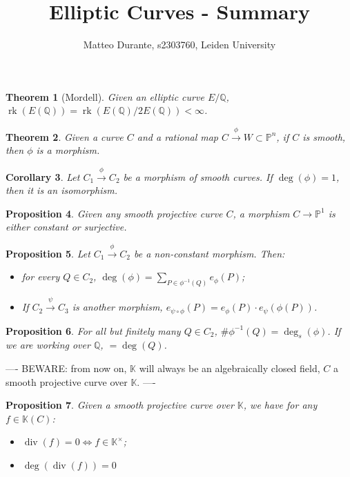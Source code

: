 \documentclass{article}
\newcommand{\numberset}{\mathbb}
\newcommand{\Q}{\numberset{Q}}
\newcommand{\K}{\numberset{K}}
\newcommand{\Ps}{\mathbb{P}}
\DeclareMathOperator{\rk}{rk}
\DeclareMathOperator{\dv}{div}
\theoremstyle{plain}
\newtheorem{thm}{Theorem}
\newtheorem{prop}[thm]{Proposition}
\newtheorem{cor}[thm]{Corollary}
\theoremstyle{definition}
\begin{document}
\title{Elliptic Curves - Summary}

\author{Matteo Durante, s2303760, Leiden University}

\maketitle

\begin{thm}[Mordell]
    Given an elliptic curve $E/\Q$, $\rk(E(\Q))=\rk(E(\Q)/2E(\Q))<\infty$.
\end{thm}

\begin{thm}
    Given a curve $C$ and a rational map $C\xrightarrow{\phi}W\subset\Ps^n$, if
    $C$ is smooth, then $\phi$ is a morphism.
\end{thm}

\begin{cor}
    Let $C_1\xrightarrow{\phi}C_2$ be a morphism of smooth curves. If
    $\deg(\phi)=1$, then it is an isomorphism.
\end{cor}

\begin{prop}
    Given any smooth projective curve $C$, a morphism $C\rightarrow\Ps^1$ is
    either constant or surjective.
\end{prop}

\begin{prop}
    Let $C_1\xrightarrow{\phi}C_2$ be a non-constant morphism. Then:
    \begin{itemize}
        \item for every $Q\in C_2$, $\deg(\phi)=\sum_{P\in\phi^{-1}(Q)}e_\phi(P)$;
        \item If $C_2\xrightarrow{\psi}C_3$ is another morphism,
            $e_{\psi\circ\phi}(P)=e_\phi(P)\cdot e_{\psi}(\phi(P))$.
    \end{itemize}
\end{prop}

\begin{prop}
    For all but finitely many $Q\in C_2$, $\#\phi^{-1}(Q)=\deg_s(\phi)$. If we
    are working over $\Q$, $=\deg(Q)$.
\end{prop}

----
BEWARE: from now on, $\K$ will always be an algebraically closed field, $C$ a
smooth projective curve over $\K$.
----

\begin{prop}
    Given a smooth projective curve over $\K$, we have for any $f\in\K(C)$:
    \begin{itemize}
        \item $\dv(f)=0\Leftrightarrow f\in\K^\times$;
        \item $\deg(\dv(f))=0$
    \end{itemize}
\end{prop}
\end{document}
